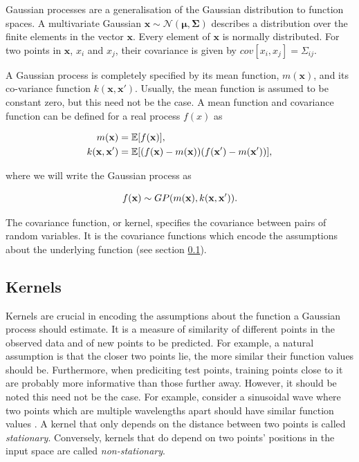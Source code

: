 \documentclass[12pt,a4paper]{report}
\theoremstyle{definition}
\begin{document}
Gaussian processes are a generalisation of the Gaussian distribution to function spaces. 
A multivariate Gaussian $\textbf{x} \sim \mathcal{N} (\boldsymbol{\mu}, \boldsymbol{\Sigma})$ describes a distribution over the finite elements in the vector $\textbf{x}$. 
Every element of $\textbf{x}$ is normally distributed. 
For two points in $\textbf{x}$, $x_{i}$ and $x_{j}$, their covariance is given by $cov[x_{i}, x_{j}] = \Sigma_{ij}$.

A Gaussian process is completely specified by its mean function, $m(\textbf{x})$, and its co-variance function $k(\textbf{x}, \textbf{x}')$.
Usually, the mean function is assumed to be constant zero, but this need not be the case.
A mean function and covariance function can be defined for a real process $f(x)$ as 

\begin{equation}
	\begin{aligned}
		\centering
		m(\textbf{x}) &= \mathbb{E}[f(\textbf{x})],\\
		k(\textbf{x}, \textbf{x}') &= \mathbb{E}[(f(\textbf{x}) - m(\textbf{x}))(f(\textbf{x}') - m(\textbf{x}'))],
	\end{aligned}
\end{equation}

where we will write the Gaussian process as 

\begin{equation}
	\centering
	f(\textbf{x}) \sim GP(m(\textbf{x}), k(\textbf{x}, \textbf{x}')).
\end{equation}

The covariance function, or kernel, specifies the covariance between pairs of random variables. It is the covariance functions which encode the assumptions about the underlying function (see section \ref{sec:Kernels}).

\subsection{Kernels} \label{sec:Kernels}

Kernels are crucial in encoding the assumptions about the function a Gaussian process should estimate. 
It is a measure of similarity of different points in the observed data and of new points to be predicted. 
For example, a natural assumption is that the closer two points lie, the more similar their function values should be. 
Furthermore, when prediciting test points, training points close to it are probably more informative than those further away. 
However, it should be noted this need not be the case. 
For example, consider a sinusoidal wave where two points which are multiple wavelengths apart should have similar function values \citep{Kaiser2017}.
A kernel that only depends on the distance between two points is called \emph{stationary}.
Conversely, kernels that do depend on two points' positions in the input space are called \emph{non-stationary}.
\end{document}
